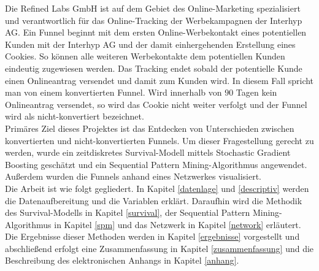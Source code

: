 Die Refined Labs GmbH ist auf dem Gebiet des Online-Marketing spezialisiert und verantwortlich für das Online-Tracking der Werbekampagnen der Interhyp AG. Ein Funnel beginnt mit dem ersten Online-Werbekontakt eines potentiellen Kunden mit der Interhyp AG und der damit einhergehenden Erstellung eines Cookies. So können alle weiteren Werbekontakte dem potentiellen Kunden eindeutig zugewiesen werden. Das Tracking endet sobald der potentielle Kunde einen Onlineantrag versendet und damit zum Kunden wird. In diesem Fall spricht man von einem konvertierten Funnel. Wird innerhalb von $90$ Tagen kein Onlineantrag versendet, so wird das Cookie nicht weiter verfolgt und der Funnel wird als nicht-konvertiert bezeichnet.\\
Primäres Ziel dieses Projektes ist das Entdecken von Unterschieden zwischen konvertierten und nicht-konvertierten Funnels. Um dieser Fragestellung gerecht zu werden, wurde ein zeitdiskretes Survival-Modell mittels Stochastic Gradient Boosting geschätzt und ein Sequential Pattern Mining-Algorithmus angewendet. Außerdem wurden die Funnels anhand eines Netzwerkes visualisiert.\\
Die Arbeit ist wie folgt gegliedert. In Kapitel \ref{datenlage} und \ref{descriptiv} werden die Datenaufbereitung und die Variablen erklärt. Daraufhin wird die Methodik des Survival-Modells in Kapitel \ref{survival}, der Sequential Pattern Mining-Algorithmus in Kapitel \ref{spm} und das Netzwerk in Kapitel \ref{network} erläutert. Die Ergebnisse dieser Methoden werden in Kapitel \ref{ergebnisse} vorgestellt und abschließend erfolgt eine Zusammenfassung in Kapitel \ref{zusammenfassung} und die Beschreibung des elektronischen Anhangs in Kapitel \ref{anhang}.